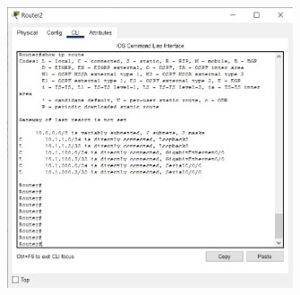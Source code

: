 \documentclass{article}
\begin{document}
\begin{figure}[H]
    \centering
    \includegraphics[width=0.75\textwidth]{figures/9.jpg}
    \caption{}
    \label{fig:fig1}
\end{figure}
\end{document}
